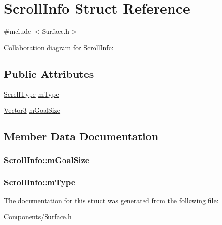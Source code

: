 \hypertarget{structScrollInfo}{}\section{Scroll\+Info Struct Reference}
\label{structScrollInfo}


{\ttfamily \#include $<$Surface.\+h$>$}



Collaboration diagram for Scroll\+Info\+:
\subsection*{Public Attributes}
\begin{DoxyCompactItemize}
\item 
\hyperlink{Surface_8h_a9611c8ec37ba9a84fb6cbd1227a08a4d}{Scroll\+Type} \hyperlink{structScrollInfo_a1a9b69a84549afbee58add396c69d218}{m\+Type}
\item 
\hyperlink{structVector3}{Vector3} \hyperlink{structScrollInfo_a8f2e42d6a4e9eb9536388955719f0a00}{m\+Goal\+Size}
\end{DoxyCompactItemize}


\subsection{Member Data Documentation}
\subsubsection[{\texorpdfstring{m\+Goal\+Size}{mGoalSize}}]{ Scroll\+Info\+::m\+Goal\+Size}\hypertarget{structScrollInfo_a8f2e42d6a4e9eb9536388955719f0a00}{}\label{structScrollInfo_a8f2e42d6a4e9eb9536388955719f0a00}
\subsubsection[{\texorpdfstring{m\+Type}{mType}}]{ Scroll\+Info\+::m\+Type}\hypertarget{structScrollInfo_a1a9b69a84549afbee58add396c69d218}{}\label{structScrollInfo_a1a9b69a84549afbee58add396c69d218}


The documentation for this struct was generated from the following file\+:\begin{DoxyCompactItemize}
\item 
Components/\hyperlink{Surface_8h}{Surface.\+h}\end{DoxyCompactItemize}
